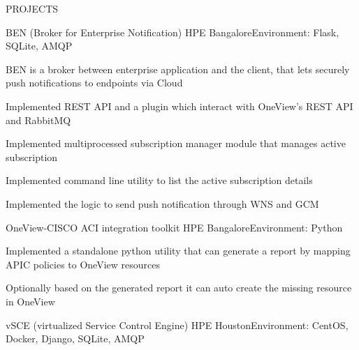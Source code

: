 \documentclass{resume} %
\begin{document}
\begin{rSection}{PROJECTS}

\begin{rSubsection}{BEN (Broker for Enterprise Notification)}
{HPE Bangalore}{Environment: Flask, SQLite, AMQP}{ }  %

\vspace{-3pt}

\item BEN is a broker between enterprise application and the client, that lets securely push notifications to endpoints via Cloud
\item Implemented REST API and a plugin which interact with OneView's REST API and RabbitMQ
\item Implemented multiprocessed subscription manager module that manages active subscription
\item Implemented command line utility to list the active subscription details
\item Implemented the logic to send push notification through WNS and GCM

\end{rSubsection}


\begin{rSubsection}{OneView-CISCO ACI integration toolkit}
{HPE Bangalore}{Environment: Python}{ }  %

\vspace{-3pt}

\item Implemented a standalone python utility that can generate a report by mapping APIC policies to OneView resources 
\item Optionally based on the generated report it can auto create the missing resource in OneView

\end{rSubsection}


\begin{rSubsection}{vSCE (virtualized Service Control Engine)}
{HPE Houston}{Environment: CentOS, Docker, Django,  SQLite, AMQP}{ }  %


\end{rSubsection}
\end{rSection}
\end{document}
